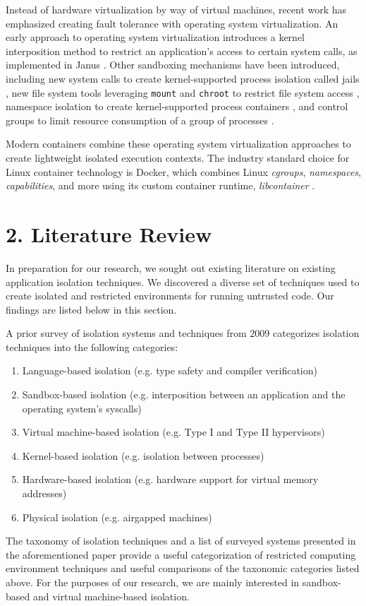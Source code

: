 \documentclass{proc}
\begin{document}
Instead of hardware virtualization by way of virtual machines, recent work has emphasized creating fault tolerance with operating system virtualization. An early approach to operating system virtualization introduces a kernel interposition method to restrict an application's access to certain system calls, as implemented in Janus \cite{goldberg1996janus}. Other sandboxing mechanisms have been introduced, including new system calls to create kernel-supported process isolation called jails \cite{kamp2000jails}, new file system tools leveraging \texttt{mount} and \texttt{chroot} to restrict file system access \cite{prevelakis2001fmac}, namespace isolation to create kernel-supported process containers \cite{biederman2006namespaces, menage2007containers}, and control groups to limit resource consumption of a group of processes \cite{menagecgroups}.

Modern containers combine these operating system virtualization approaches to create lightweight isolated execution contexts. The industry standard choice for Linux container technology is Docker, which combines Linux \textit{cgroups}, \textit{namespaces}, \textit{capabilities}, and more using its custom container runtime, \textit{libcontainer} \cite{hykes2014libcontainer}.

\section*{2. Literature Review}

In preparation for our research, we sought out existing literature on existing application isolation techniques. We discovered a diverse set of techniques used to create isolated and restricted environments for running untrusted code. Our findings are listed below in this section.

A prior survey of isolation systems and techniques from 2009 \cite{viswanathan2009isolation} categorizes isolation techniques into the following categories:
\begin{enumerate}
    \item Language-based isolation (e.g. type safety and compiler verification)
    \item Sandbox-based isolation (e.g. interposition between an application and the operating system's syscalls)
    \item Virtual machine-based isolation (e.g. Type I and Type II hypervisors)
    \item Kernel-based isolation (e.g. isolation between processes)
    \item Hardware-based isolation (e.g. hardware support for virtual memory addresses)
    \item Physical isolation (e.g. airgapped machines)
\end{enumerate}
The taxonomy of isolation techniques and a list of surveyed systems presented in the aforementioned paper provide a useful categorization of restricted computing environment techniques and useful comparisons of the taxonomic categories listed above. For the purposes of our research, we are mainly interested in sandbox-based and virtual machine-based isolation.
\end{document}

